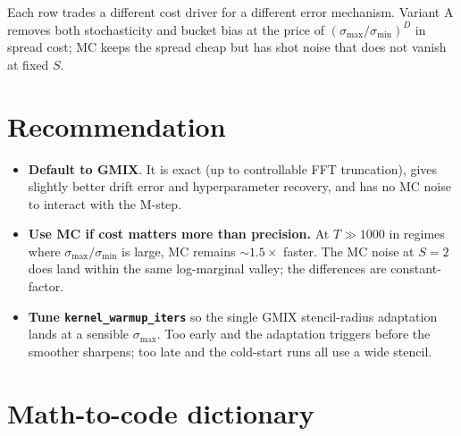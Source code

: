 \documentclass[11pt]{article}
\newcommand{\code}[1]{\texttt{\small #1}}
\begin{document}
Each row trades a different cost driver for a different error
mechanism.  Variant A removes both stochasticity and bucket bias at
the price of $(\sigma_{\max}/\sigma_{\min})^D$ in spread cost; MC
keeps the spread cheap but has shot noise that does not vanish at
fixed $S$.

\section{Recommendation}
\label{sec:reco}

\begin{itemize}
\item \textbf{Default to GMIX}.  It is exact (up to controllable FFT
truncation), gives slightly better drift error and hyperparameter
recovery, and has no MC noise to interact with the M-step.
\item \textbf{Use MC if cost matters more than precision.}  At $T \gg
1000$ in regimes where $\sigma_{\max}/\sigma_{\min}$ is large, MC
remains $\sim 1.5\times$ faster.  The MC noise at $S\!=\!2$ does
land within the same log-marginal valley; the differences are
constant-factor.
\item \textbf{Tune \code{kernel\_warmup\_iters}} so the single GMIX
stencil-radius adaptation lands at a sensible $\sigma_{\max}$.  Too
early and the adaptation triggers before the smoother sharpens;
too late and the cold-start runs all use a wide stencil.
\end{itemize}

\section{Math-to-code dictionary}
\label{sec:dict}
\end{document}
